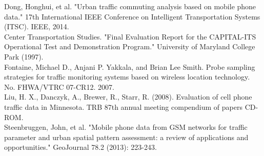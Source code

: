 \documentclass[hidelinks,12pt]{article}
\begin{document}
	\noindent Dong, Honghui, et al. "Urban traffic commuting analysis based on mobile phone data." 17th International IEEE Conference on Intelligent Transportation Systems (ITSC). IEEE, 2014.\\
	
	\noindent Center Transportation Studies. "Final Evaluation Report for the CAPITAL-ITS Operational Test and Demonstration Program." University of Maryland College Park (1997).\\
	
	\noindent Fontaine, Michael D., Anjani P. Yakkala, and Brian Lee Smith. Probe sampling strategies for traffic monitoring systems based on wireless location technology. No. FHWA/VTRC 07-CR12. 2007.\\
	
	\noindent Liu, H. X., Danczyk, A., Brewer, R., Starr, R. (2008). Evaluation of cell phone traffic data in Minnesota. TRB 87th annual meeting compendium of papers CD-ROM.\\
	
	\noindent Steenbruggen, John, et al. "Mobile phone data from GSM networks for traffic parameter and urban spatial pattern assessment: a review of applications and opportunities." GeoJournal 78.2 (2013): 223-243.\\
	
	\clearpage
	\appendix
\end{document}
